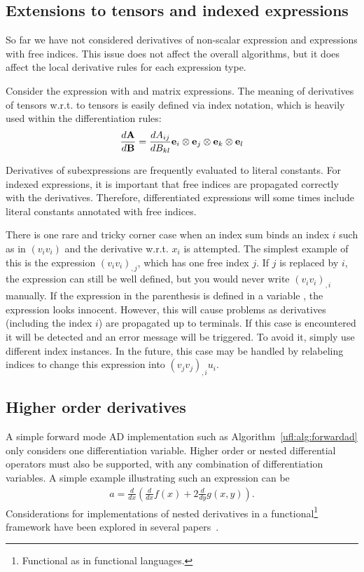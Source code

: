 \subsection{Extensions to tensors and indexed expressions}

So far we have not considered derivatives of non-scalar expression and
expressions with free indices.  This issue does not affect the overall
algorithms, but it does affect the local derivative rules for each
expression type.

Consider the expression  with  and
 matrix expressions.  The meaning of derivatives of tensors
w.r.t. to tensors is easily defined via index notation, which is
heavily used within the differentiation rules:
\begin{align}
\frac{d\mathbf{A}}{d\mathbf{B}} = \frac{dA_{ij}}{d B_{kl}} \mathbf{e}_i\otimes\mathbf{e}_j\otimes\mathbf{e}_k\otimes\mathbf{e}_l
\end{align}

Derivatives of subexpressions are frequently evaluated to literal
constants.  For indexed expressions, it is important that free indices
are propagated correctly with the derivatives.  Therefore,
differentiated expressions will some times include literal constants
annotated with free indices.

There is one rare and tricky corner case when an index sum binds an
index $i$ such as in $(v_i v_i)$ and the derivative w.r.t. $x_i$ is
attempted.  The simplest example of this is the expression $(v_i
v_i)_{,j}$, which has one free index $j$.  If $j$ is replaced by $i$,
the expression can still be well defined, but you would never write
$(v_i v_i)_{,i}$ manually.  If the expression in the parenthesis is
defined in a variable , the expression
 looks innocent. However, this will cause problems as
derivatives (including the index $i$) are propagated up to terminals.
If this case is encountered it will be detected and an error message
will be triggered.  To avoid it, simply use different index instances.
In the future, this case may be handled by relabeling indices to
change this expression into $(v_j v_j)_{,i}u_i$.

\subsection{Higher order derivatives}
A simple forward mode AD implementation such as
Algorithm~\ref{ufl:alg:forwardad} only considers one differentiation
variable.  Higher order or nested differential operators must also be
supported, with any combination of differentiation variables.  A
simple example illustrating such an expression can be
\begin{align} \label{ufl:eq:nested}
a = \frac{d}{dx}\left( \frac{d}{dx} f(x) + 2 \frac{d}{dy} g(x,y) \right) .
\end{align}
Considerations for implementations of nested derivatives
in a functional\footnote{Functional as in functional languages.}
framework have been explored in several
papers~\cite{Kar2001,PeaSis2007,SisPea2008}.

